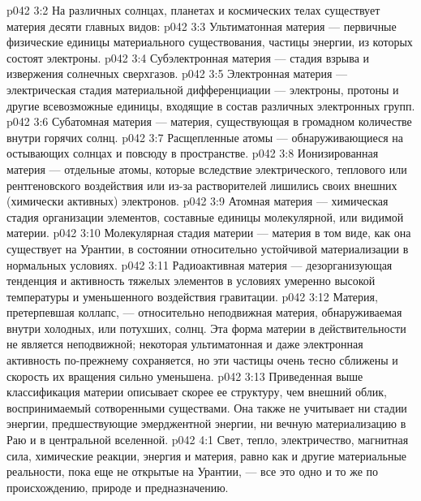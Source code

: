 \vs p042 3:2 На различных солнцах, планетах и космических телах существует материя десяти главных видов:
\vs p042 3:3 \pc {}\bibnobreakspace Ультиматонная материя --- первичные физические единицы материального существования, частицы энергии, из которых состоят электроны.
\vs p042 3:4 \pc {}\bibnobreakspace Субэлектронная материя --- стадия взрыва и извержения солнечных сверхгазов.
\vs p042 3:5 \pc {}\bibnobreakspace Электронная материя --- электрическая стадия материальной дифференциации --- электроны, протоны и другие всевозможные единицы, входящие в состав различных электронных групп.
\vs p042 3:6 \pc {}\bibnobreakspace Субатомная материя --- материя, существующая в громадном количестве внутри горячих солнц.
\vs p042 3:7 \pc {}\bibnobreakspace Расщепленные атомы --- обнаруживающиеся на остывающих солнцах и повсюду в пространстве.
\vs p042 3:8 \pc {}\bibnobreakspace Ионизированная материя --- отдельные атомы, которые вследствие электрического, теплового или рентгеновского воздействия или из\hyp{}за растворителей лишились своих внешних (химически активных) электронов.
\vs p042 3:9 \pc {}\bibnobreakspace Атомная материя --- химическая стадия организации элементов, составные единицы молекулярной, или видимой материи.
\vs p042 3:10 \pc {}\bibnobreakspace Молекулярная стадия материи --- материя в том виде, как она существует на Урантии, в состоянии относительно устойчивой материализации в нормальных условиях.
\vs p042 3:11 \pc {}\bibnobreakspace Радиоактивная материя --- дезорганизующая тенденция и активность тяжелых элементов в условиях умеренно высокой температуры и уменьшенного воздействия гравитации.
\vs p042 3:12 \pc {}\bibnobreakspace Материя, претерпевшая коллапс, --- относительно неподвижная материя, обнаруживаемая внутри холодных, или потухших, солнц. Эта форма материи в действительности не является неподвижной; некоторая ультиматонная и даже электронная активность по\hyp{}прежнему сохраняется, но эти частицы очень тесно сближены и скорость их вращения сильно уменьшена.
\vs p042 3:13 \pc Приведенная выше классификация материи описывает скорее ее структуру, чем внешний облик, воспринимаемый сотворенными существами. Она также не учитывает ни стадии энергии, предшествующие эмерджентной энергии, ни вечную материализацию в Раю и в центральной вселенной.
\vs p042 4:1 Свет, тепло, электричество, магнитная сила, химические реакции, энергия и материя, равно как и другие материальные реальности, пока еще не открытые на Урантии, --- все это одно и то же по происхождению, природе и предназначению.
